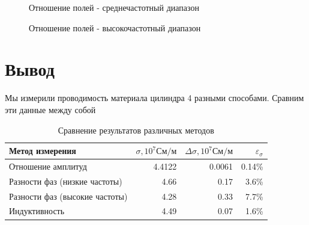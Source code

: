 \documentclass{article}
\begin{document}
\newpage

\begin{figure}[h]
    \caption{Отношение полей - среднечастотный диапазон}\label{fig:mid_freq_ratio}
    \caption{Отношение полей - высокочастотный диапазон}\label{fig:high_freq_ratio}
    \newpage
\end{figure}

\section{Вывод}
Мы измерили проводимость материала цилиндра 4 разными способами. Сравним эти данные
между собой

\begin{table}[!h]
\begin{center}
\begin{tabular}{lrrr}
Метод измерения & $\sigma, 10^{7} См/м$ & $\Delta\sigma, 10^{7} См/м$ & $\varepsilon_{\sigma}$\\
\toprule
Отношение амплитуд & 4.4122 & 0.0061 & 0.14\%\\
Разности фаз (низкие частоты) & 4.66 & 0.17 & 3.6\%\\
Разности фаз (высокие частоты) & 4.28 & 0.33 & 7.7\%\\
Индуктивность & 4.49 & 0.07 & 1.6\%\\

\end{tabular}
\end{center}
    \caption{Сравнение результатов различных методов}\label{}
\end{table}
\end{document}
